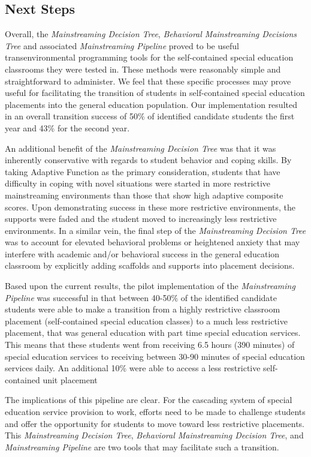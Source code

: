 \documentclass[twoside]{article}
\begin{document}
\subsection{Next Steps}
Overall, the \textit{Mainstreaming Decision Tree}, \textit{Behavioral Mainstreaming Decisions Tree} and associated \textit{Mainstreaming Pipeline} proved to be useful transenvironmental programming tools for the self-contained special education classrooms they were tested in. These methods were reasonably simple and straightforward to administer. We feel that these specific processes may prove useful for facilitating the transition of students in self-contained special education placements into the general education population. Our implementation resulted in an overall transition success of 50\% of identified candidate students the first year and 43\% for the second year. 

An additional benefit of the \textit{Mainstreaming Decision Tree} was that it was inherently conservative with regards to student behavior and coping skills. By taking Adaptive Function as the primary consideration, students that have difficulty in coping with novel situations were started in more restrictive mainstreaming environments than those that show high adaptive composite scores. Upon demonstrating success in these more restrictive environments, the supports were faded and the student moved to increasingly less restrictive environments. In a similar vein, the final step of the \textit{Mainstreaming Decision Tree} was to account for elevated behavioral problems or heightened anxiety that may interfere with academic and/or behavioral success in the general education classroom by explicitly adding scaffolds and supports into placement decisions.

Based upon the current results, the pilot implementation of the \textit{Mainstreaming Pipeline} was successful in that between 40-50\% of the identified candidate students were able to make a transition from a highly restrictive classroom placement (self-contained special education classes) to a much less restrictive placement, that was general education with part time special education services. This means that these students went from receiving 6.5 hours (390 minutes) of special education services to receiving between 30-90 minutes of special education services daily. An additional 10\% were able to access a less restrictive self-contained unit placement 

The implications of this pipeline are clear. For the cascading system of special education service provision to work, efforts need to be made to challenge students and offer the opportunity for students to move toward less restrictive placements. This \textit{Mainstreaming Decision Tree}, \textit{Behavioral Mainstreaming Decision Tree}, and \textit{Mainstreaming Pipeline} are two tools that may facilitate such a transition.
\end{document}
